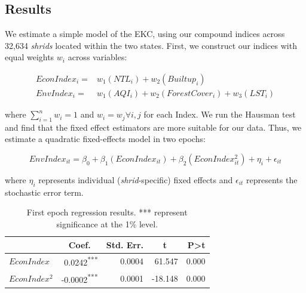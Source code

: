 \documentclass{article}
\begin{document}
\subsection{Results}

We estimate a simple model of the EKC, using our compound indices across 32,634 \textit{shrids} located within the two states. First, we construct our indices with equal weights $w_i$ across variables:

\begin{align*}
    EconIndex_i = & w_1(NTL_i) + w_2(Builtup_i) \\
    EnvIndex_i = & w_1(AQI_i) + w_2(ForestCover_i) + w_3(LST_i)
\end{align*}

where $\sum_{i=1}^{n}w_i = 1$ and $w_i = w_j \forall i, j$ for each Index. We run the Hausman test and find that the fixed effect estimators are more suitable for our data. Thus, we estimate a quadratic fixed-effects model in two epochs:

\[
EnvIndex_{it} = \beta_0 + \beta_1(EconIndex_{it}) + \beta_2(EconIndex_{it}^2) + \eta_i + \epsilon_{it} 
\]

where $\eta_i$ represents individual (\textit{shrid}-specific) fixed effects and $\epsilon_{it}$ represents the stochastic error term.







\begin{table}[h]
    \centering
    \begin{tabular}{l|rrrr}
    \hline
    \multicolumn{1}{c}{\textbf{}} & \multicolumn{1}{c}{\textbf{Coef.}} & \multicolumn{1}{c}{\textbf{Std. Err.}} & \multicolumn{1}{c}{\textbf{t}} & \textbf{P\textgreater{}t} \\ \hline
    $EconIndex$                     & 0.0242\textsuperscript{***}                             & 0.0004                                 & 61.547     & 0.000                     \\ 
    $EconIndex^2$                   & -0.0002\textsuperscript{***}                            & 0.0001                                 & -18.148    & 0.000                    
    \\ \hline        
\end{tabular}
\caption{First epoch regression results. *** represent significance at the 1\% level.}
\end{table}
\end{document}
